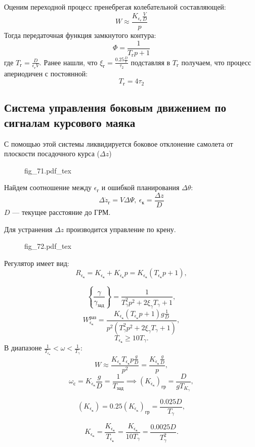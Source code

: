 \documentclass{article}
\newcommand{\incfig}[1]{
    {#1.pdf_tex}
}
\begin{document}
Оценим переходной процесс пренебрегая колебательной составляющей:
\[
	W \approx \frac{K_{\epsilon_\text{г}} \frac{V}{D}}{p}
\]
Тогда передаточная функция замкнутого контура:
\[
	\Phi = \frac{1}{T_\text{г} p + 1}
\]
где $T_\text{г} = \frac{D}{\epsilon_\text{г} V}$.
Ранее нашли, что $\xi_\text{г} = \frac{0.25 \frac{D}{V}}{\tau_2}$ подставляя в
$T_\text{г}$ получаем, что процесс апериодичен с постоянной:
\[
	T_\text{г} = 4 \tau_2
\]

\subsection{Система управления боковым движением по сигналам курсового маяка}
С помощью этой системы ликвидируется боковое отклонение самолета от плоскости
посадочного курса ($\Delta z$)
\begin{figure}[H]
	\centering
	\incfig{fig_71}
	\label{fig:fig_71}
\end{figure}
Найдем соотношение между $\epsilon_\text{г}$ и ошибкой планирования $\Delta
	\theta$:
\[
	\Delta \dot{z}_\text{г} = V \Delta \Psi, \ \epsilon_\text{к} = \frac{\Delta
		z}{D}
\]
$D$ --- текущее расстояние до ГРМ.

Для устранения $\Delta z$ производится управление по крену.
\begin{figure}[H]
	\centering
	\incfig{fig_72}
	\label{fig:fig_72}
\end{figure}
Регулятор имеет вид:
\[
	R_{\epsilon_\text{к}} = K_{\epsilon_\text{к}} +
	K_{\dot{\epsilon}_{\text{к}}} p =
	K_{\epsilon_\text{к}}(T_{\epsilon_\text{к}} p + 1),
\]

\[
	\left\{ \frac{\gamma}{\gamma_\text{зад}} \right\} = \frac{1}{ T_\gamma^2
		p^2 + 2 \xi_\gamma T_\gamma + 1},
\]
\[
	W_{\epsilon_\text{к}}^\text{раз} = \frac{K_{\epsilon_\text{к}}
		(T_{\epsilon_\text{к}} p + 1) g \frac{1}{D}}{ p^2 ( T_\gamma^2 p^2 + 2
		\xi_\gamma T_\gamma + 1)},
\]
\[
	T_{\epsilon_\text{к}} \ge 10 T_\gamma.
\]
В диапазоне $\frac{1}{T_{\epsilon_\text{к}}} < \omega < \frac{1}{T_\gamma}$:
\[
	W \approx \frac{K_{\epsilon_\text{к}} T_{\epsilon_\text{к}} p
		\frac{g}{D}}{p^2} = \frac{K_{\dot{\epsilon}_{\text{к}}} \frac{g}{D}}{p},
\]
\[
	\omega_{\text{с}} = K_{\dot{\epsilon}_{\text{к}}} \frac{g}{D} =
	\frac{1}{T_{\text{зад}}} \implies
	(K_{\dot{\epsilon}_{\text{к}}})_{\text{гр}} = \frac{D}{g T_{K_{\gamma}}} ,
\]

\[
	(K_{\epsilon_\text{к}}) = 0.25 (K_{\dot{\epsilon}_{\text{к}}})_{\text{гр}}
	= \frac{0.025 D}{T_{\gamma}},
\]

\[
	K_{\epsilon_\text{к}} =
	\frac{K_{\dot{\epsilon}_{\text{к}}}}{T_{\epsilon_\text{к}}} =
	\frac{K_{\dot{\epsilon}_{\text{к}}}}{10 T_\gamma} = \frac{0.0025
		D}{T_\gamma^2}.
\]
\end{document}
